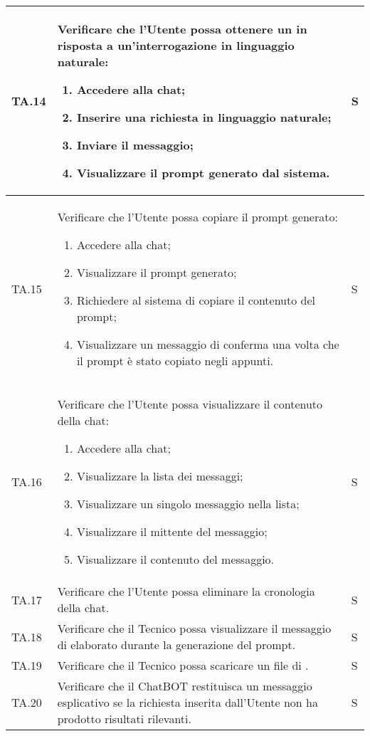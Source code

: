 \begin{adjustwidth}{-0.5cm}{-0.5cm}
\begin{longtable}{|P{1.5cm}|>{\raggedright}P{9.5cm}|>{\arraybackslash}P{1.5cm}|}
		\hline TA.14 & Verificare che l'Utente possa ottenere un  in risposta a un'interrogazione in linguaggio naturale:
		\begin{enumerate}
			\item Accedere alla chat;
			\item Inserire una richiesta in linguaggio naturale;
			\item Inviare il messaggio;
			\item Visualizzare il prompt generato dal sistema.
		\end{enumerate}
		& S \\
		\hline TA.15 & Verificare che l'Utente possa copiare il prompt generato:
		\begin{enumerate}
			\item Accedere alla chat;
			\item Visualizzare il prompt generato;
			\item Richiedere al sistema di copiare il contenuto del prompt;
			\item Visualizzare un messaggio di conferma una volta che il prompt è stato copiato negli appunti.
		\end{enumerate}
		& S \\
		\hline TA.16 & Verificare che l'Utente possa visualizzare il contenuto della chat:
		\begin{enumerate}
			\item Accedere alla chat;
			\item Visualizzare la lista dei messaggi;
			\item Visualizzare un singolo messaggio nella lista;
			\item Visualizzare il mittente del messaggio;
			\item Visualizzare il contenuto del messaggio.
		\end{enumerate}
		& S \\
		\hline TA.17 & Verificare che l'Utente possa eliminare la cronologia della chat. & S \\
		\hline TA.18 & Verificare che il Tecnico possa visualizzare il messaggio di  elaborato durante la generazione del prompt. & S \\
		\hline TA.19 & Verificare che il Tecnico possa scaricare un file di . & S \\
		\hline TA.20 & Verificare che il ChatBOT restituisca un messaggio esplicativo se la richiesta inserita dall'Utente non ha prodotto risultati rilevanti. & S \\
	\end{longtable}
\end{adjustwidth}
\egroup

